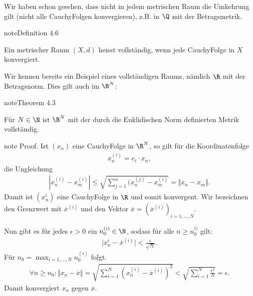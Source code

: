 \documentclass[letterpaper,10pt,english]{jupyterBook}
\begin{document}
Wir haben schon gesehen, dass nicht in jedem metrischen Raum die Umkehrung gilt (nicht alle Cauchy\sphinxhyphen{}Folgen konvergieren), z.B. in \(\Q\) mit der Betragsmetrik.
\label{metrik/konvfolgen:definition-7}
\begin{sphinxadmonition}{note}{Definition 4.6}



Ein metrischer Raum \((X,d)\) heisst vollständig, wenn jede Cauchy\sphinxhyphen{}Folge in \(X\) konvergiert.
\end{sphinxadmonition}

Wir kennen bereits ein Beispiel eines vollständigen Raums, nämlich \(\R\) mit der Betragsnorm. Dies gilt auch im \(\R^N\):
\label{metrik/konvfolgen:theorem-8}
\begin{sphinxadmonition}{note}{Theorem 4.3}



Für \(N \in \N\) ist \(\R^N\) mit der durch die Euklidischen Norm definierten Metrik vollständig.
\end{sphinxadmonition}

\begin{sphinxadmonition}{note}
Proof.  Ist \((x_n)\) eine Cauchy\sphinxhyphen{}Folge in \(\R^N\), so gilt für die Koordinatenfolge
\begin{equation*}
\begin{split} x_n^{(i)} = e_i \cdot x_n,\end{split}
\end{equation*}
die Ungleichung
\begin{equation*}
\begin{split} | x_n^{(i)} -  x_m^{(i)}  | \leq \sqrt{ \sum_{j=1}^n (x_n^{(j)} -  x_m^{(i)} } = \Vert x_n - x_m \Vert .\end{split}
\end{equation*}
Damit ist \((x_n^{i})\) eine Cauchy\sphinxhyphen{}Folge in \(\R\) und somit konvergent. Wir bezeichnen den Grenzwert mit \(\overline{x}^{(i)}\) und den Vektor
\(\overline{x}=(\overline{x}^{(i)})_{i=1,\ldots,N}\).

Nun gibt es für jedes \(\epsilon > 0\) ein \(n_0^{(i)} \in \N\), sodass für alle \( n \geq n_0^{i)}\) gilt:
\begin{equation*}
\begin{split} \vert x_n^{i} -\overline{x}^{(i)} \vert < \frac{\epsilon}{\sqrt{N}}.\end{split}
\end{equation*}
Für \(n_0 = \max_{i=1,\ldots,N} n_0^{(i)}\) folgt.
\begin{equation*}
\begin{split} \forall n \geq n_0: \Vert x_n - \overline{x} \Vert = \sqrt{\sum_{i=1}^N (x_n^{(i)} - \overline{x}^{(i)})^2} < \sqrt{\sum_{i=1}^N \frac{\epsilon^2}N} = \epsilon.\end{split}
\end{equation*}
Damit konvergiert \(x_n\) gegen \(\overline{x}\).
\end{sphinxadmonition}
\end{document}
